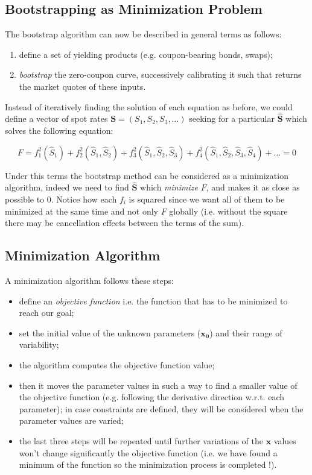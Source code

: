 \subsection{Bootstrapping as Minimization Problem}
\label{sec:bootstrap_as_minimization}
The bootstrap algorithm can now be described in general terms as follows:
\begin{enumerate}
\item define a set of yielding products (e.g. coupon-bearing bonds, swaps);
\item \emph{bootstrap} the zero-coupon curve, successively calibrating it such that returns the market quotes of these inputs.
\end{enumerate}

Instead of iteratively finding the solution of each equation as before, we could define a vector of spot rates $\mathbf{S} = (S_1, S_2, S_3, \ldots)$ seeking for a particular $\mathbf{\hat{S}}$ which solves the following equation:

\begin{equation}
F = f_1^2(\hat{S}_1) + f_2^2(\hat{S}_1, \hat{S}_2) + f_3^2(\hat{S}_1, \hat{S}_2, \hat{S}_3) + f_4^2(\hat{S}_1, \hat{S}_2, \hat{S}_3, \hat{S}_4) + \ldots = 0
\end{equation}

Under this terms the bootstrap method can be considered as a minimization algorithm, indeed we need to find $\mathbf{\hat{S}}$ which \emph{minimize} $F$, and makes it as close as possible to 0.
Notice how each \(f_i\) is squared since we want all of them to be minimized at the same time and not only \(F\) globally (i.e. without the square there may be cancellation effects between the terms of the sum).

\subsection{Minimization Algorithm}\label{minimization-algorithm}

A minimization algorithm follows these steps:

\begin{itemize}
\tightlist
\item
  define an \emph{objective function} i.e. the function that has to be minimized to reach our goal;
\item
  set the initial value of the unknown parameters (\(\mathbf{x_0}\)) and their range of variability;
\item
  the algorithm computes the objective function value;
\item
  then it moves the parameter values in such a way to find a smaller
  value of the objective function (e.g. following the derivative direction w.r.t. each parameter); in case constraints are defined, they will be considered when the parameter values are varied;
\item
  the last three steps will be repeated until further variations of the \(\mathbf{x}\) values won't change significantly the objective
  function (i.e. we have found a minimum of the function so the
  minimization process is completed !).
\end{itemize}

